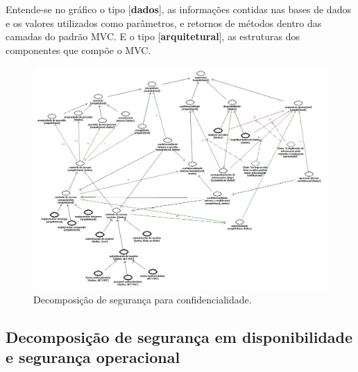 Entende-se no gráfico o tipo [\textbf{dados}], as informações contidas nas bases de dados e os valores utilizados como parâmetros, e retornos de métodos dentro das camadas do padrão MVC. E o tipo [\textbf{arquitetural}], as estruturas dos componentes que compõe o MVC. 

\begin{landscape}
	
	\begin{figure}[h!]
		\centering
		\includegraphics[keepaspectratio=true,scale=0.43]{figuras/CatalogOfSecurity.jpg}
		\caption{Decomposição de segurança para confidencialidade.}
		\label{SIG-Completo}
	\end{figure}

\end{landscape}

\subsection{Decomposição de segurança em disponibilidade e segurança operacional}
\label{sub:DecomposicaoDeSegurancaEmDisponibilidadeESeguranca}

